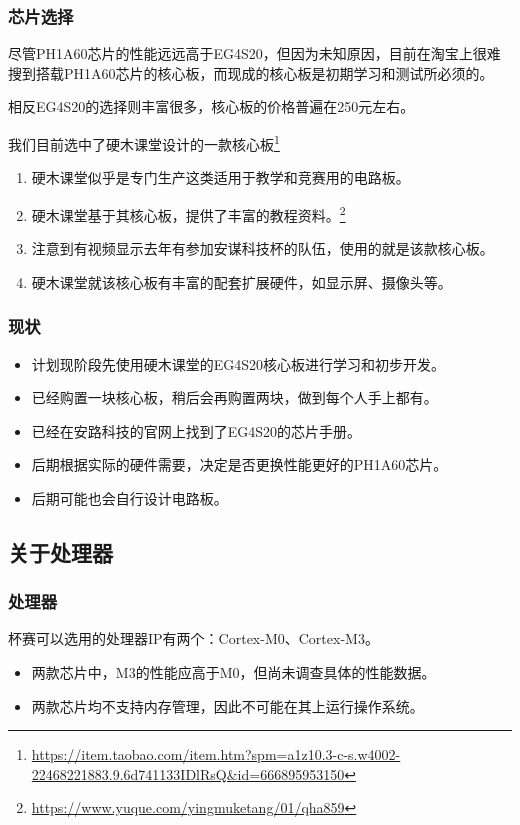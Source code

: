 \documentclass[compress,aspectratio=169]{ctexbeamer}
\begin{document}
\begin{frame}
    \frametitle{芯片选择}
    尽管PH1A60芯片的性能远远高于EG4S20，但因为未知原因，目前在淘宝上很难搜到搭载PH1A60芯片的核心板，而现成的核心板是初期学习和测试所必须的。

    相反EG4S20的选择则丰富很多，核心板的价格普遍在250元左右。
    
    我们目前选中了硬木课堂设计的一款核心板\footnote{\url{https://item.taobao.com/item.htm?spm=a1z10.3-c-s.w4002-22468221883.9.6d741133IDlRsQ&id=666895953150}}
    \begin{enumerate}
        \item 硬木课堂似乎是专门生产这类适用于教学和竞赛用的电路板。
        \item 硬木课堂基于其核心板，提供了丰富的教程资料。\footnote{\url{https://www.yuque.com/yingmuketang/01/qha859}}
        \item 注意到有视频显示去年有参加安谋科技杯的队伍，使用的就是该款核心板。
        \item 硬木课堂就该核心板有丰富的配套扩展硬件，如显示屏、摄像头等。
    \end{enumerate}
\end{frame}

\begin{frame}
    \frametitle{现状}
    \begin{itemize}
        \item 计划现阶段先使用硬木课堂的EG4S20核心板进行学习和初步开发。
        \item 已经购置一块核心板，稍后会再购置两块，做到每个人手上都有。
        \item 已经在安路科技的官网上找到了EG4S20的芯片手册。
        \item 后期根据实际的硬件需要，决定是否更换性能更好的PH1A60芯片。
        \item 后期可能也会自行设计电路板。
    \end{itemize}
\end{frame}

\subsection{关于处理器}

\begin{frame}
    \frametitle{处理器}
    杯赛可以选用的处理器IP有两个：Cortex-M0、Cortex-M3。
    \begin{itemize}
        \item 两款芯片中，M3的性能应高于M0，但尚未调查具体的性能数据。
        \item 两款芯片均不支持内存管理，因此不可能在其上运行操作系统。
    \end{itemize}
\end{frame}
\end{document}
